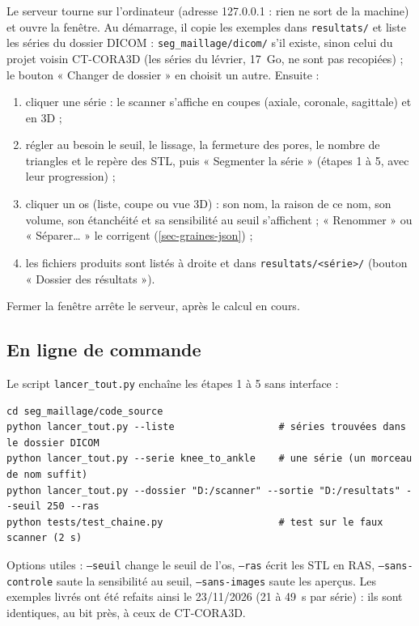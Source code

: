 \documentclass[11pt,a4paper]{article}
\newcommand{\fichier}[1]{\texttt{\small #1}}
\begin{document}
Le serveur tourne sur l'ordinateur (adresse 127.0.0.1 : rien ne sort de la machine) et ouvre la fenêtre. Au
démarrage, il copie les exemples dans \fichier{resultats/} et liste les séries du dossier DICOM : \fichier{seg\_maillage/dicom/}
s'il existe, sinon celui du projet voisin CT-CORA3D (les séries du lévrier, 17~Go, ne sont pas recopiées) ; le bouton
« Changer de dossier » en choisit un autre. Ensuite :
\begin{enumerate}
  \item cliquer une série : le scanner s'affiche en coupes (axiale, coronale, sagittale) et en 3D ;
  \item régler au besoin le seuil, le lissage, la fermeture des pores, le nombre de triangles et le repère des STL,
  puis « Segmenter la série » (étapes 1 à 5, avec leur progression) ;
  \item cliquer un os (liste, coupe ou vue 3D) : son nom, la raison de ce nom, son volume, son étanchéité et sa
  sensibilité au seuil s'affichent ; « Renommer » ou « Séparer\ldots{} » le corrigent (\cref{sec-graines-json}) ;
  \item les fichiers produits sont listés à droite et dans \fichier{resultats/<série>/} (bouton « Dossier des
  résultats »).
\end{enumerate}
Fermer la fenêtre arrête le serveur, après le calcul en cours.

\subsection{En ligne de commande}

Le script \fichier{lancer\_tout.py} enchaîne les étapes 1 à 5 sans interface :

\begin{Verbatim}
cd seg_maillage/code_source
python lancer_tout.py --liste                  # séries trouvées dans le dossier DICOM
python lancer_tout.py --serie knee_to_ankle    # une série (un morceau de nom suffit)
python lancer_tout.py --dossier "D:/scanner" --sortie "D:/resultats" --seuil 250 --ras
python tests/test_chaine.py                    # test sur le faux scanner (2 s)
\end{Verbatim}

Options utiles : \texttt{--seuil} change le seuil de l'os, \texttt{--ras} écrit les STL en RAS,
\texttt{--sans-controle} saute la sensibilité au seuil, \texttt{--sans-images} saute les aperçus. Les exemples
livrés ont été refaits ainsi le 23/11/2026 (21 à 49~s par série) : ils sont identiques, au bit près, à ceux de
CT-CORA3D.
\end{document}
